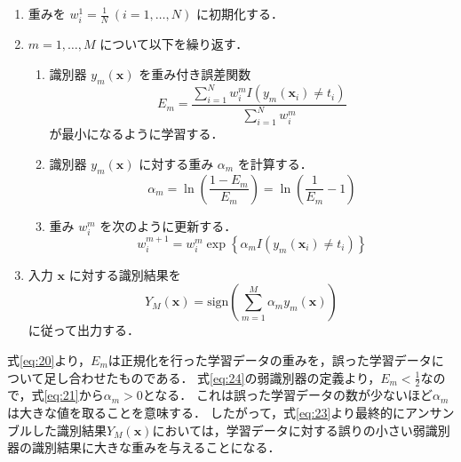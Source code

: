 \documentclass[dvipdfmx]{jreport}
\begin{document}
\begin{tcolorbox}[title = \textbf{アダブーストの学習アルゴリズム}]
    \begin{enumerate}
        \item 重みを $w_i^1 = \frac{1}{N}\ (i = 1, \dots, N)$ に初期化する．
        \item $m = 1, \dots, M$ について以下を繰り返す．
        \begin{enumerate}
            \item 識別器 $y_m(\bm{x})$ を重み付き誤差関数
                \begin{equation}
                    E_m = \frac{\sum_{i=1}^{N} w_i^m I(y_m(\bm{x}_i) \neq t_i)}{\sum_{i=1}^{N} w_i^m} \label{eq:20}
                \end{equation}
            が最小になるように学習する．
            \item 識別器 $y_m(\bm{x})$ に対する重み $\alpha_m$ を計算する．
                \begin{equation}
                    \alpha_m = \ln \left( \frac{1 - E_m}{E_m} \right) = \ln \left(\frac{1}{E_m}-1 \right) \label{eq:21}
                \end{equation}
            \item 重み $w_i^m$ を次のように更新する．
                \begin{equation}
                    w^{m+1}_i = w_i^m \exp \left\{ \alpha_m I(y_m(\bm{x}_i) \neq t_i) \right\} \label{eq:22}
                \end{equation}
        \end{enumerate}
            \item 入力 $\bm{x}$ に対する識別結果を
                \begin{equation}
                    Y_M(\bm{x}) = \text{sign} \left( \sum_{m=1}^{M} \alpha_m y_m(\bm{x}) \right) \label{eq:23}
                \end{equation}
                に従って出力する．
    \end{enumerate}
\end{tcolorbox}

式\eqref{eq:20}より，$E_m$は正規化を行った学習データの重みを，誤った学習データについて足し合わせたものである．
式\eqref{eq:24}の弱識別器の定義より，$E_m < \frac{1}{2}$なので，式\eqref{eq:21}から$\alpha_m > 0$となる．
これは誤った学習データの数が少ないほど$\alpha_m$は大きな値を取ることを意味する．
したがって，式\eqref{eq:23}より最終的にアンサンブルした識別結果$Y_M(\bm{x})$においては，学習データに対する誤りの小さい弱識別器の識別結果に大きな重みを与えることになる．
\end{document}
